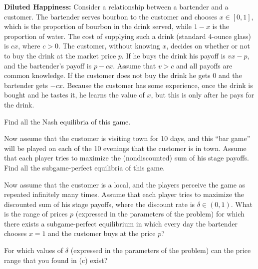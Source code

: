 
\textbf{Diluted Happiness:} Consider a relationship between a bartender and a customer. The
bartender serves bourbon to the customer and chooses $x \in [0, 1]$, which is the proportion of
bourbon in the drink served, while $1 - x$ is the proportion of water. The cost of supplying such a
drink (standard 4-ounce glass) is $cx$, where $c > 0$. The customer, without knowing $x$, decides on
whether or not to buy the drink at the market price $p$. If he buys the drink his payoff is
$vx - p$, and the bartender's payoff is $p - cx$. Assume that $v > c$ and all payoffs are common
knowledge. If the customer does not buy the drink he gets 0 and the bartender gets $-cx$. Because
the customer has some experience, once the drink is bought and he tastes it, he learns the value of
$x$, but this is only after he pays for the drink.
\begin{partes}
\item Find all the Nash equilibria of this game.
\item Now assume that the customer is visiting town for 10 days, and this ``bar game'' will be
played on each of the 10 evenings that the customer is in town. Assume that each player tries to
maximize the (nondiscounted) sum of his stage payoffs. Find all the subgame-perfect equilibria of
this game.
\item Now assume that the customer is a local, and the players perceive the game as repeated
infinitely many times. Assume that each player tries to maximize the discounted sum of his stage
payoffs, where the discount rate is $\delta \in (0, 1)$. What is the range of prices $p$ (expressed
in the parameters of the problem) for which there exists a subgame-perfect equilibrium in which
every day the bartender chooses $x = 1$ and the customer buys at the price $p$?
\item For which values of $\delta$ (expressed in the parameters of the problem) can the price range
that you found in (c) exist?
\end{partes}
\resolespaco


